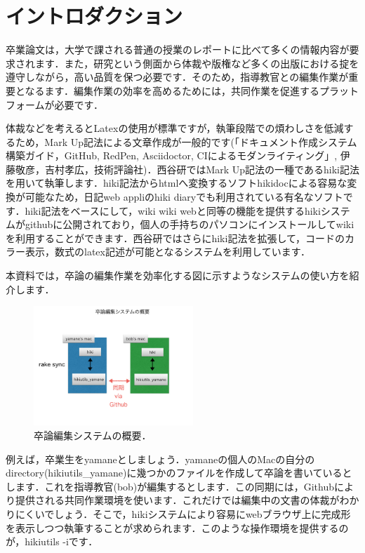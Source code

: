 
\section{イントロダクション}
卒業論文は，大学で課される普通の授業のレポートに比べて多くの情報内容が要求されます．また，研究という側面から体裁や版権など多くの出版における掟を遵守しながら，高い品質を保つ必要です．そのため，指導教官との編集作業が重要となるます．編集作業の効率を高めるためには，共同作業を促進するプラットフォームが必要です．

体裁などを考えるとLatexの使用が標準ですが，執筆段階での煩わしさを低減するため，Mark Up記法による文章作成が一般的です(「ドキュメント作成システム構築ガイド，GitHub, RedPen, Asciidoctor, CIによるモダンライティング」, 伊藤敬彦，吉村孝広，技術評論社)．西谷研ではMark Up記法の一種であるhiki記法を用いて執筆します．hiki記法からhtmlへ変換するソフトhikidocによる容易な変換が可能なため，日記web appliのhiki diaryでも利用されている有名なソフトです．hiki記法をベースにして，wiki wiki webと同等の機能を提供するhikiシステムがgithubに公開されており，個人の手持ちのパソコンにインストールしてwikiを利用することができます．西谷研ではさらにhiki記法を拡張して，コードのカラー表示，数式のlatex記述が可能となるシステムを利用しています．

本資料では，卒論の編集作業を効率化する図に示すようなシステムの使い方を紹介します．

\begin{figure}[htbp]\begin{center}
\includegraphics[width=6cm,bb=0 0 442 500]{../figs/./hikiutils_bob.002.jpeg}
\caption{卒論編集システムの概要．}
\label{default}\end{center}\end{figure}
例えば，卒業生をyamaneとしましょう．yamaneの個人のMacの自分のdirectory(hikiutils\_yamane)に幾つかのファイルを作成して卒論を書いているとします．これを指導教官(bob)が編集するとします．この同期には，Githubにより提供される共同作業環境を使います．これだけでは編集中の文書の体裁がわかりにくいでしょう．そこで，hikiシステムにより容易にwebブラウザ上に完成形を表示しつつ執筆することが求められます．このような操作環境を提供するのが，hikiutils -iです．

